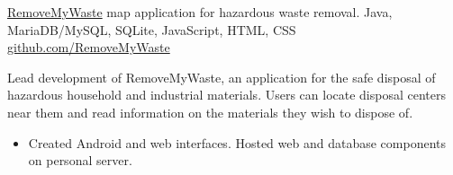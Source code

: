 \showoff
{\textcolor{my-blue}{\href{https://removemywaste.liambeckman.com/}{RemoveMyWaste}}}
{map application for hazardous waste removal.}
{Java, MariaDB/MySQL, SQLite, JavaScript, HTML, CSS}
{\textcolor{my-blue}{\href{https://github.com/RemoveMyWaste/RemoveMyWaste}{github.com/RemoveMyWaste}}}

Lead development of RemoveMyWaste, an application for the safe disposal of hazardous household and industrial materials. Users can locate disposal centers near them and read information on the materials they wish to dispose of.

\begin{itemize}[label=$\triangleright$, itemsep=0px, topsep=5px]
\item Created Android and web interfaces. Hosted web and database components on personal server.
\end{itemize}


\myBreak

